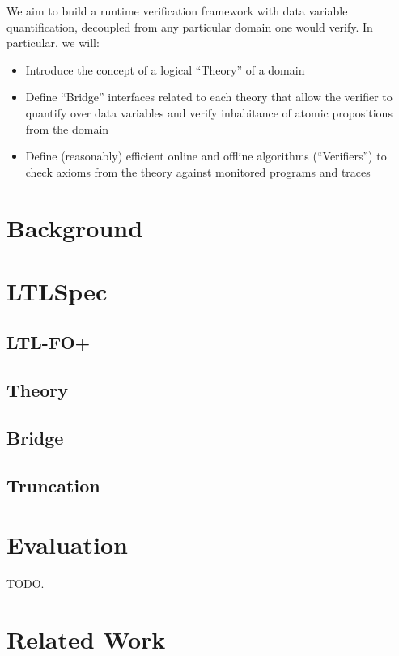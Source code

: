 \documentclass[format=acmsmall, nonacm=true, review=true]{acmart}
\begin{document}
We aim to build a runtime verification framework with data variable quantification, decoupled from any particular domain one would verify.
In particular, we will:
\begin{itemize}
  \item Introduce the concept of a logical “Theory” of a domain
  \item Define “Bridge” interfaces related to each theory that allow the verifier to quantify over data variables and verify inhabitance of atomic propositions from the domain
  \item Define (reasonably) efficient online and offline algorithms (“Verifiers”) to check axioms from the theory against monitored programs and traces
\end{itemize}

\section{Background}

\section{LTLSpec}
\subsection{LTL-FO+}

\subsection{Theory}

\subsection{Bridge}

\subsection{Truncation}

\section{Evaluation}

TODO.

\section{Related Work}
\end{document}
